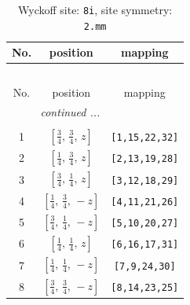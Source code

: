 \documentclass[fleqn,8pt]{jsarticle}
\begin{document}
\renewcommand{\arraystretch}{1.2}
\begin{longtable}{ccc}
\caption{Wyckoff site: {\tt 8i}, site symmetry: {\tt 2.mm}}
 \\
 \hline \hline
No. & position & mapping \\ \hline \endfirsthead

\multicolumn{2}{l}{\tablename\ \thetable{}} \\
 \hline \hline
No. & position & mapping \\ \hline \endhead

 \hline \hline
\multicolumn{2}{r}{\footnotesize\it continued ...} \\ \endfoot

 \hline \hline
\multicolumn{2}{r}{} \\ \endlastfoot

1 & $\left[ \frac{3}{4},\, \frac{3}{4},\, z \right]$ & {\tt [1,15,22,32]} \\ \hline
2 & $\left[ \frac{1}{4},\, \frac{3}{4},\, z \right]$ & {\tt [2,13,19,28]} \\ \hline
3 & $\left[ \frac{3}{4},\, \frac{1}{4},\, z \right]$ & {\tt [3,12,18,29]} \\ \hline
4 & $\left[ \frac{1}{4},\, \frac{3}{4},\, - z \right]$ & {\tt [4,11,21,26]} \\ \hline
5 & $\left[ \frac{3}{4},\, \frac{1}{4},\, - z \right]$ & {\tt [5,10,20,27]} \\ \hline
6 & $\left[ \frac{1}{4},\, \frac{1}{4},\, z \right]$ & {\tt [6,16,17,31]} \\ \hline
7 & $\left[ \frac{1}{4},\, \frac{1}{4},\, - z \right]$ & {\tt [7,9,24,30]} \\ \hline
8 & $\left[ \frac{3}{4},\, \frac{3}{4},\, - z \right]$ & {\tt [8,14,23,25]} \\
\end{longtable}
\renewcommand{\arraystretch}{1.2}
\end{document}
